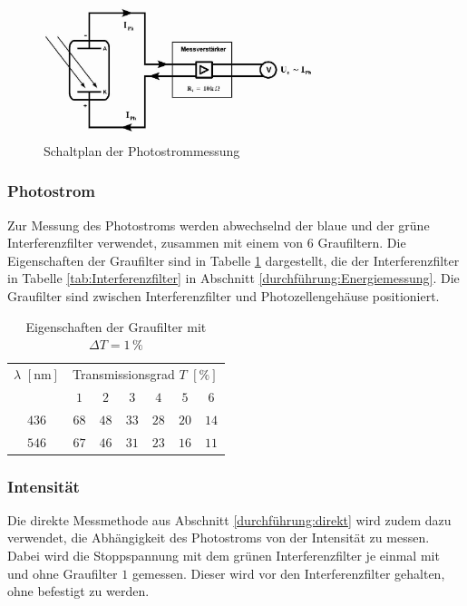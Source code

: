 \documentclass[12pt,a4paper]{scrartcl}
\numberwithin{equation}{section} %
\begin{document}
\begin{figure}[h!]
	\centering
	\includegraphics[width=0.7\textwidth]{../media/B1.4/Schaltplan_Photostrom.jpg}
	\caption{Schaltplan der Photostrommessung}
	\label{fig:Schaltplan Photostrom}
\end{figure}

\subsubsection{Photostrom}
Zur Messung des Photostroms werden abwechselnd der blaue und der grüne Interferenzfilter verwendet, zusammen mit einem von $6$ Graufiltern. Die Eigenschaften der Graufilter sind in Tabelle \ref{tab:Graufilter} dargestellt, die der Interferenzfilter in Tabelle \ref{tab:Interferenzfilter} in Abschnitt \ref{durchführung:Energiemessung}. Die Graufilter sind zwischen Interferenzfilter und Photozellengehäuse positioniert.

\begin{table}[h!]
	\centering
	\begin{tabular}{c|c|c|c|c|c|c}
		$\lambda$ $[\mathrm{nm}]$ & \multicolumn{6}{c}{Transmissionsgrad $T$ $[\%]$} \\
		& $1$ & $2$ & $3$ & $4$ & $5$ & $6$ \\
		\hline
		$436$ & $68$ & $48$ & $33$ & $28$ & $20$ & $14$ \\
		$546$ & $67$ & $46$ & $31$ & $23$ & $16$ & $11$
	\end{tabular}
	\caption{Eigenschaften der Graufilter mit $\Delta T=1\,\%$}
	\label{tab:Graufilter}
\end{table}

\subsubsection{Intensität}
Die direkte Messmethode aus Abschnitt \ref{durchführung:direkt} wird zudem dazu verwendet, die Abhängigkeit des Photostroms von der Intensität zu messen. Dabei wird die Stoppspannung mit dem grünen Interferenzfilter je einmal mit und ohne Graufilter $1$ gemessen. Dieser wird vor den Interferenzfilter gehalten, ohne befestigt zu werden.
\end{document}

